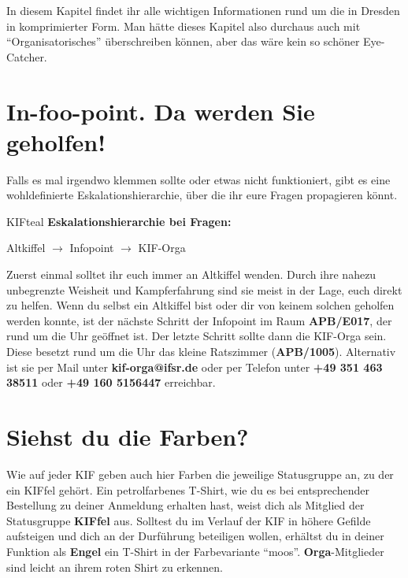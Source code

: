 
In diesem Kapitel findet ihr alle wichtigen Informationen rund um die \KIF{} in Dresden in komprimierter Form.
Man hätte dieses Kapitel also durchaus auch mit ``Organisatorisches'' überschreiben können, aber das wäre kein so schöner Eye-Catcher.

\section*{In-foo-point. Da werden Sie geholfen!}

Falls es mal irgendwo klemmen sollte oder etwas nicht funktioniert, gibt es eine wohldefinierte Eskalationshierarchie, über die ihr eure Fragen propagieren könnt.

\begin{awesomeblock}[KIFteal]{2pt}{\faQuestion}{KIFteal}
    \textbf{Eskalationshierarchie bei Fragen:}

  Altkiffel $\longrightarrow$ Infopoint $\longrightarrow$ KIF-Orga
\end{awesomeblock}

Zuerst einmal solltet ihr euch immer an Altkiffel wenden.
Durch ihre nahezu unbegrenzte Weisheit und Kampferfahrung sind sie meist in der Lage, euch direkt zu helfen.
Wenn du selbst ein Altkiffel bist oder dir von keinem solchen geholfen werden konnte, ist der nächste Schritt der Infopoint im Raum \textbf{APB/E017}, der rund um die Uhr geöffnet ist.
Der letzte Schritt sollte dann die KIF-Orga sein.
Diese besetzt rund um die Uhr das kleine Ratszimmer (\textbf{APB/1005}).
Alternativ ist sie per Mail unter \textbf{kif-orga@ifsr.de} oder per Telefon unter \textbf{+49 351 463 38511} oder \textbf{+49 160 5156447} erreichbar.

\section*{Siehst du die Farben?}

Wie auf jeder KIF geben auch hier Farben die jeweilige Statusgruppe an, zu der ein KIFfel gehört.
Ein petrolfarbenes T-Shirt, wie du es bei entsprechender Bestellung zu deiner Anmeldung erhalten hast, weist dich als Mitglied der Statusgruppe \textbf{KIFfel} aus.
Solltest du im Verlauf der KIF in höhere Gefilde aufsteigen und dich an der Durführung beteiligen wollen, erhältst du in deiner Funktion als \textbf{Engel} ein T-Shirt in der Farbevariante \enquote{moos}.
\textbf{Orga}-Mitglieder sind leicht an ihrem roten Shirt zu erkennen.

